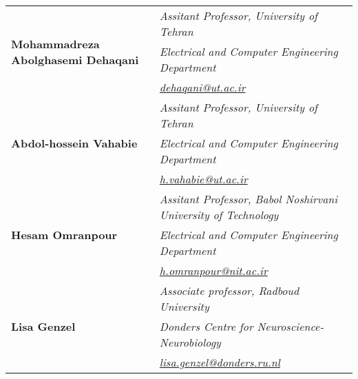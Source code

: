 \documentclass[a4paper,11pt]{article}
\makeatletter
\newcommand{\resumePOR}[3]{
\vspace{0.5mm}\item
    \begin{tabular*}{0.97\textwidth}[t]{l@{\extracolsep{\fill}}r}
        \textbf{#1}\hspace{0.3mm}#2 & \textit{\small{#3}} 
    \end{tabular*}
    \vspace{-2mm}
}
\newcommand{\resumeSubHeadingListStart}{\begin{itemize}[leftmargin=*,labelsep=0mm]}
\newcommand{\resumeSubHeadingListEnd}{\end{itemize}\vspace{2mm}}
\makeatother
\begin{document}
\setlength{\tabcolsep}{10pt}
\renewcommand{\arraystretch}{1.2}
\begin{tabular}{ l | l }
\multirow{3}{*}{\textbf{Mohammadreza Abolghasemi Dehaqani}} & \textit{Assitant Professor, University of Tehran}\\
& \textit{Electrical and Computer Engineering Department} \\
& \href{mailto:dehaqani@ut.ac.ir}{\textit{dehaqani@ut.ac.ir}} \\ \hline
\multirow{3}{*}{\textbf{Abdol-hossein Vahabie}} & \textit{Assitant Professor, University of Tehran}\\
& \textit{Electrical and Computer Engineering Department} \\
& \href{mailto:h.vahabie@ut.ac.ir}{\textit{h.vahabie@ut.ac.ir}} \\ \hline
\multirow{3}{*}{\textbf{Hesam Omranpour}} & \textit{Assitant Professor, Babol Noshirvani University of Technology}\\
& \textit{Electrical and Computer Engineering Department} \\
& \href{mailto:h.omranpour@nit.ac.ir}{\textit{h.omranpour@nit.ac.ir}} \\ \hline
\multirow{3}{*}{\textbf{Lisa Genzel}} & \textit{Associate professor, Radboud University}\\
& \textit{Donders Centre for Neuroscience-Neurobiology} \\
& \href{mailto:lisa.genzel@donders.ru.nl}{\textit{lisa.genzel@donders.ru.nl}} \\
\end{tabular}
\vspace{-5.5mm}
 
    



\end{document}
